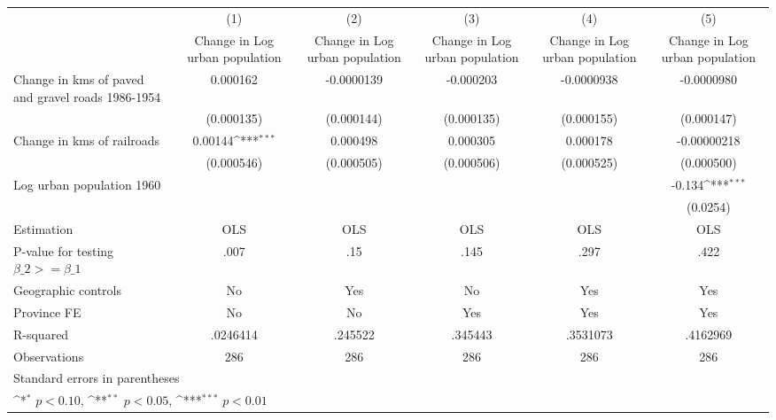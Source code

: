 {
\def\sym#1{\ifmmode^{#1}\else\(^{#1}\)\fi}
\begin{tabular}{l*{5}{c}}
\hline\hline
                    &\multicolumn{1}{c}{(1)}&\multicolumn{1}{c}{(2)}&\multicolumn{1}{c}{(3)}&\multicolumn{1}{c}{(4)}&\multicolumn{1}{c}{(5)}\\
                    &\multicolumn{1}{c}{Change in Log urban population}&\multicolumn{1}{c}{Change in Log urban population}&\multicolumn{1}{c}{Change in Log urban population}&\multicolumn{1}{c}{Change in Log urban population}&\multicolumn{1}{c}{Change in Log urban population}\\
\hline
Change in kms of paved and gravel roads 1986-1954&    0.000162         &  -0.0000139         &   -0.000203         &  -0.0000938         &  -0.0000980         \\
                    &  (0.000135)         &  (0.000144)         &  (0.000135)         &  (0.000155)         &  (0.000147)         \\
[1em]
Change in kms of railroads&     0.00144\sym{***}&    0.000498         &    0.000305         &    0.000178         & -0.00000218         \\
                    &  (0.000546)         &  (0.000505)         &  (0.000506)         &  (0.000525)         &  (0.000500)         \\
[1em]
Log urban population 1960&                     &                     &                     &                     &      -0.134\sym{***}\\
                    &                     &                     &                     &                     &    (0.0254)         \\
\hline
Estimation          &         OLS         &         OLS         &         OLS         &         OLS         &         OLS         \\
P-value for testing $\beta\_2 >= \beta\_1$&        .007         &         .15         &        .145         &        .297         &        .422         \\
Geographic controls &          No         &         Yes         &          No         &         Yes         &         Yes         \\
Province FE         &          No         &          No         &         Yes         &         Yes         &         Yes         \\
R-squared           &    .0246414         &     .245522         &     .345443         &    .3531073         &    .4162969         \\
Observations        &         286         &         286         &         286         &         286         &         286         \\
\hline\hline
\multicolumn{6}{l}{\footnotesize Standard errors in parentheses}\\
\multicolumn{6}{l}{\footnotesize \sym{*} \(p<0.10\), \sym{**} \(p<0.05\), \sym{***} \(p<0.01\)}\\
\end{tabular}
}
